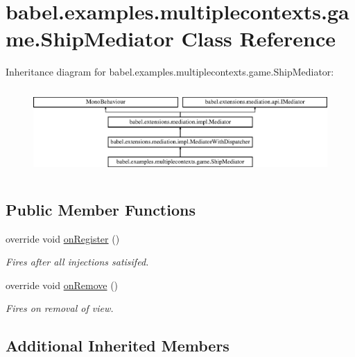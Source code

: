 \hypertarget{classbabel_1_1examples_1_1multiplecontexts_1_1game_1_1_ship_mediator}{\section{babel.\-examples.\-multiplecontexts.\-game.\-Ship\-Mediator Class Reference}
\label{classbabel_1_1examples_1_1multiplecontexts_1_1game_1_1_ship_mediator}
}
Inheritance diagram for babel.\-examples.\-multiplecontexts.\-game.\-Ship\-Mediator\-:\begin{figure}[H]
\begin{center}
\leavevmode
\includegraphics[height=3.333333cm]{classbabel_1_1examples_1_1multiplecontexts_1_1game_1_1_ship_mediator}
\end{center}
\end{figure}
\subsection*{Public Member Functions}
\begin{DoxyCompactItemize}
\item 
override void \hyperlink{classbabel_1_1examples_1_1multiplecontexts_1_1game_1_1_ship_mediator_a516ff2f6e04dc24cc7365ddc77621f72}{on\-Register} ()
\begin{DoxyCompactList}\small\item\em Fires after all injections satisifed. \end{DoxyCompactList}\item 
override void \hyperlink{classbabel_1_1examples_1_1multiplecontexts_1_1game_1_1_ship_mediator_a6f73a1c0f96e9e38d7ea5eaae00622fd}{on\-Remove} ()
\begin{DoxyCompactList}\small\item\em Fires on removal of view. \end{DoxyCompactList}\end{DoxyCompactItemize}
\subsection*{Additional Inherited Members}


